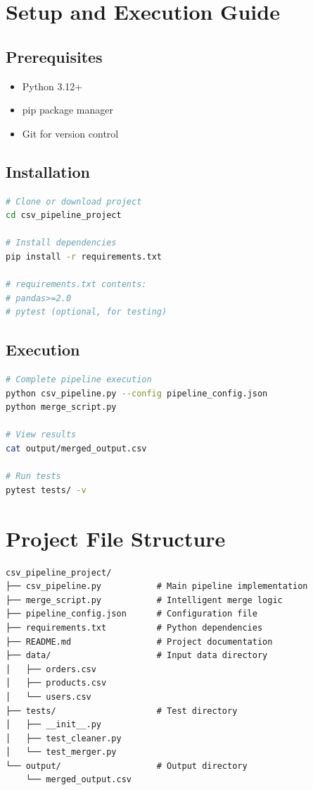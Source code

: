 \documentclass[12pt,a4paper]{report}
\begin{document}
\appendix

\chapter{Setup and Execution Guide}

\section{Prerequisites}

\begin{itemize}
    \item Python 3.12+
    \item pip package manager
    \item Git for version control
\end{itemize}

\section{Installation}

\begin{lstlisting}[language=bash]
# Clone or download project
cd csv_pipeline_project

# Install dependencies
pip install -r requirements.txt

# requirements.txt contents:
# pandas>=2.0
# pytest (optional, for testing)
\end{lstlisting}

\section{Execution}

\begin{lstlisting}[language=bash]
# Complete pipeline execution
python csv_pipeline.py --config pipeline_config.json
python merge_script.py

# View results
cat output/merged_output.csv

# Run tests
pytest tests/ -v
\end{lstlisting}

\chapter{Project File Structure}

\begin{verbatim}
csv_pipeline_project/
├── csv_pipeline.py           # Main pipeline implementation
├── merge_script.py           # Intelligent merge logic
├── pipeline_config.json      # Configuration file
├── requirements.txt          # Python dependencies
├── README.md                 # Project documentation
├── data/                     # Input data directory
│   ├── orders.csv
│   ├── products.csv
│   └── users.csv
├── tests/                    # Test directory
│   ├── __init__.py
│   ├── test_cleaner.py
│   └── test_merger.py
└── output/                   # Output directory
    └── merged_output.csv
\end{verbatim}
\end{document}
